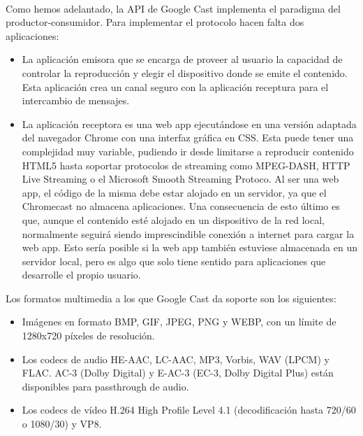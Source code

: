 \

Como hemos adelantado, la API de Google Cast implementa el paradigma del productor-consumidor. Para implementar el protocolo hacen falta dos aplicaciones:

\begin{itemize}

	\item La aplicación emisora que se encarga de proveer al usuario la capacidad de controlar la reproducción y elegir el dispositivo donde se emite el contenido.
	Esta aplicación crea un canal seguro con la aplicación receptura para el intercambio de mensajes.

	\item La aplicación receptora es una web app ejecutándose en una versión adaptada del navegador Chrome con una interfaz gráfica en CSS.
	Esta puede tener una complejidad muy variable, pudiendo ir desde limitarse a reproducir contenido HTML5 hasta soportar protocolos de streaming como MPEG-DASH, HTTP Live Streaming o el Microsoft Smooth Streaming Protoco\cite{CastSDK}.
	Al ser una web app, el código de la misma debe estar alojado en un servidor, ya que el Chromecast no almacena aplicaciones.
	Una consecuencia de esto último es que, aunque el contenido esté alojado en un dispositivo de la red local, normalmente seguirá siendo imprescindible conexión a internet para cargar la web app. Esto sería posible si la web app también estuviese almacenada en un servidor local, pero es algo que solo tiene sentido para aplicaciones que desarrolle el propio usuario.

\end{itemize}

Los formatos multimedia a los que Google Cast da soporte son los siguientes:

\begin{itemize}

	\item Imágenes en formato BMP, GIF, JPEG, PNG y WEBP, con un límite de 1280x720 píxeles de resolución.

	\item Los codecs de audio HE-AAC, LC-AAC, MP3, Vorbis, WAV (LPCM) y FLAC. AC-3 (Dolby Digital) y E-AC-3 (EC-3, Dolby Digital Plus) están disponibles para passthrough de audio.

	\item Los codecs de vídeo H.264 High Profile Level 4.1 (decodificación hasta 720/60 o 1080/30) y VP8.

\end{itemize}

